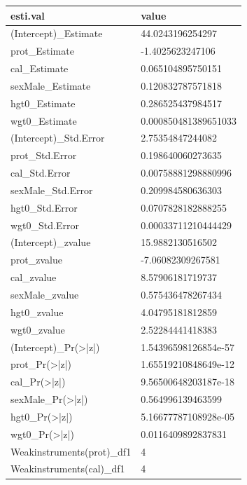 \documentclass[
]{book}
\begin{document}
\begin{table}[!h]
\centering
\begin{tabular}{l|l}
\hline
esti.val & value\\
\hline
\rowcolor{gray!6}  (Intercept)\_Estimate & 44.0243196254297\\
\hline
prot\_Estimate & -1.4025623247106\\
\hline
\rowcolor{gray!6}  cal\_Estimate & 0.065104895750151\\
\hline
sexMale\_Estimate & 0.120832787571818\\
\hline
\rowcolor{gray!6}  hgt0\_Estimate & 0.286525437984517\\
\hline
wgt0\_Estimate & 0.000850481389651033\\
\hline
\rowcolor{gray!6}  (Intercept)\_Std.Error & 2.75354847244082\\
\hline
prot\_Std.Error & 0.198640060273635\\
\hline
\rowcolor{gray!6}  cal\_Std.Error & 0.00758881298880996\\
\hline
sexMale\_Std.Error & 0.209984580636303\\
\hline
\rowcolor{gray!6}  hgt0\_Std.Error & 0.0707828182888255\\
\hline
wgt0\_Std.Error & 0.00033711210444429\\
\hline
\rowcolor{gray!6}  (Intercept)\_zvalue & 15.9882130516502\\
\hline
prot\_zvalue & -7.06082309267581\\
\hline
\rowcolor{gray!6}  cal\_zvalue & 8.57906181719737\\
\hline
sexMale\_zvalue & 0.575436478267434\\
\hline
\rowcolor{gray!6}  hgt0\_zvalue & 4.04795181812859\\
\hline
wgt0\_zvalue & 2.52284441418383\\
\hline
\rowcolor{gray!6}  (Intercept)\_Pr(>|z|) & 1.54396598126854e-57\\
\hline
prot\_Pr(>|z|) & 1.65519210848649e-12\\
\hline
\rowcolor{gray!6}  cal\_Pr(>|z|) & 9.56500648203187e-18\\
\hline
sexMale\_Pr(>|z|) & 0.564996139463599\\
\hline
\rowcolor{gray!6}  hgt0\_Pr(>|z|) & 5.16677787108928e-05\\
\hline
wgt0\_Pr(>|z|) & 0.0116409892837831\\
\hline
\rowcolor{gray!6}  Weakinstruments(prot)\_df1 & 4\\
\hline
Weakinstruments(cal)\_df1 & 4\\

\end{tabular}
\end{table}
\end{document}
